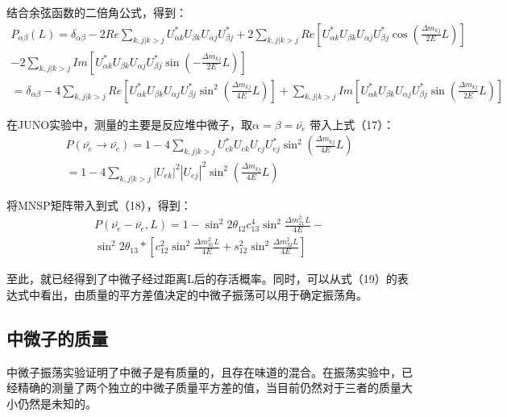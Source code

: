 \documentclass[10pt,a4paper]{article}
\begin{document}
结合余弦函数的二倍角公式，得到：
\begin{equation}
\begin{split}
P_{\alpha\beta}(L)=\delta_{\alpha\beta}-2Re\sum_{k,j |k>j}U_{\alpha k}^{*}U_{\beta k}U_{\alpha j}U_{\beta j}^{*}+2\sum_{k,j |k>j}Re[U_{\alpha k}^{*}U_{\beta k}U_{\alpha j}U_{\beta j}^{*}\cos(\frac{\Delta m_{kj}}{2E}L)]\\-2\sum_{k,j |k>j}Im[U_{\alpha k}^{*}U_{\beta k}U_{\alpha j}U_{\beta j}^{*}\sin(-\frac{\Delta m_{kj}}{2E}L)]\\
=\delta_{\alpha\beta}-4\sum_{k,j |k>j}Re[U_{\alpha k}^{*}U_{\beta k}U_{\alpha j}U_{\beta j}^{*}\sin^2(\frac{\Delta m_{kj}}{4E}L)]+\sum_{k,j |k>j}Im[U_{\alpha k}^{*}U_{\beta k}U_{\alpha j}U_{\beta j}^{*}\sin(\frac{\Delta m_{kj}}{2E}L)]
\end{split}
\end{equation}


在JUNO实验中，测量的主要是反应堆中微子，取$\alpha=\beta=\bar{\nu_e}$
带入上式（17）：
\begin{equation}
\begin{split}
P(\bar{\nu_e}\rightarrow\bar{\nu_e})=1-4\sum_{k,j |k>j}U_{e k}^{*}U_{e k}U_{e j}U_{e j}^{*}\sin^2(\frac{\Delta m_{kj}}{4E}L)\\
=1-4\sum_{k,j |k>j}|U_{e k}|^2|U_{e j}|^2\sin^2(\frac{\Delta m_{kj}}{4E}L)
\end{split}
\end{equation}


将MNSP矩阵带入到式（18），得到：
\begin{equation}
\begin{split}
P(\bar{\nu_e}-\bar{\nu_e},L)=1-{\sin^2{2\theta_{12}}} c_{13}^4\sin^2{\frac{\Delta{m_{21}^2}L}{4E}}-\\
\sin^2{2\theta_{13}} *[c_{12}^2\sin^2{\frac{\Delta{m_{31}^2}L}{4E}}+s_{12}^2\sin^2{\frac{\Delta{m_{32}^2}L}{4E}}]
\end{split}
\end{equation}

至此，就已经得到了中微子经过距离L后的存活概率。同时，可以从式（19）的表达式中看出，由质量的平方差值决定的中微子振荡可以用于确定振荡角。
\newpage
\subsection{中微子的质量}\label{sub:sysover}

中微子振荡实验证明了中微子是有质量的，且存在味道的混合。在振荡实验中，已经精确的测量了两个独立的中微子质量平方差的值，当目前仍然对于三者的质量大小仍然是未知的。
\end{document}
